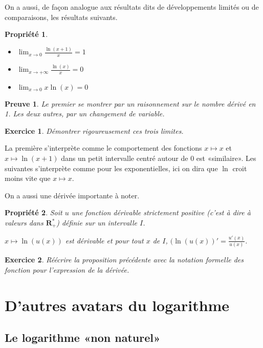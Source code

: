\documentclass[11pt,a4paper,french]{article}
\newcommand{\R}{\mathbf{R}}
\theoremstyle{break}
\newtheorem{propriete}{Propriété}
\theoremstyle{plain}
\newtheorem{exerciceT}{Exercice}
\theoremstyle{nonumberplain}
\newtheorem{preuve}{Preuve}
\theoremstyle{nonumberbreak}
\newenvironment{exercice}{\begin{framed}\begin{exerciceT}}{\end{exerciceT}\end{framed}}
\begin{document}
On a aussi, de façon analogue aux résultats dits de développements
limités ou de comparaisons, les résultats suivants.

\begin{propriete}~\\[-6ex]
  \begin{multicols}{3}
    \begin{itemize}
      \item $\lim_{x\to0}\frac{\ln(x+1)}x = 1$
      \item $\lim_{x\to +\infty}\frac{\ln(x)}x = 0$
      \item $\lim_{x\to 0}x\ln(x) = 0$
    \end{itemize}
  \end{multicols}
\end{propriete}
\begin{preuve}
  Le premier se montrer par un raisonnement sur le nombre dérivé en 1.
  Les deux autres, par un changement de variable.
\end{preuve}

\begin{exercice}
  Démontrer rigoureusement ces trois limites.
\end{exercice}

La première s'interprète comme le comportement des fonctions $x\mapsto
x$ et $x\mapsto \ln(x+1)$ dans un petit intervalle centré autour de 0
est «similaire». Les suivantes s'interprète comme pour les
exponentielles, ici on dira que $\ln$ croit moins vite que $x\mapsto x$.

On a aussi une dérivée importante à noter.
\begin{propriete}
  Soit $u$ une fonction dérivable strictement positive (c'est à dire à
  valeurs dans $\R_+^*$) définie sur un intervalle $I$.

  $x\mapsto \ln(u(x))$ est dérivable et pour tout $x$ de $I$,
  $(\ln(u(x))' = \frac{u'(x)}{u(x)}$.
\end{propriete}

\begin{exercice}
  Réécrire la proposition précédente avec la notation formelle des
  fonction pour l'expression de la dérivée.
\end{exercice}

\section{D'autres avatars du logarithme}

\subsection{Le logarithme «non naturel»}
\end{document}
